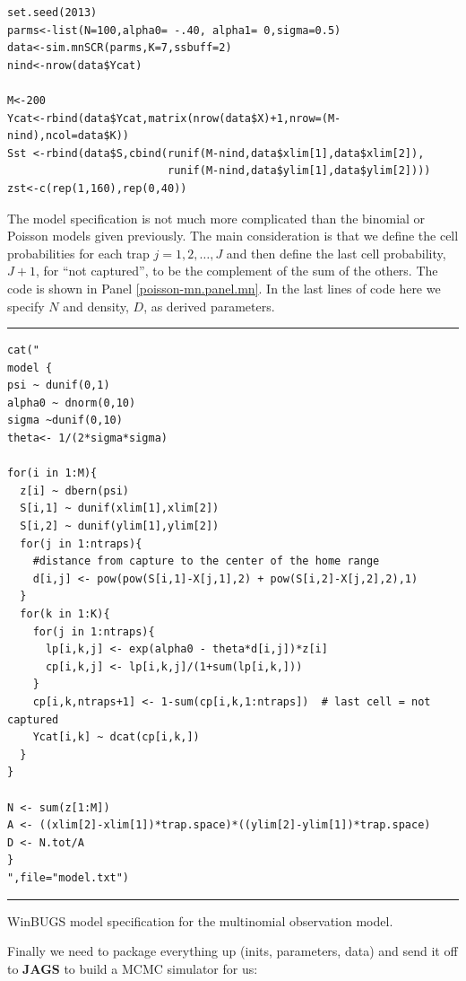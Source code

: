 {{\small 
\begin{verbatim}
set.seed(2013)
parms<-list(N=100,alpha0= -.40, alpha1= 0,sigma=0.5)
data<-sim.mnSCR(parms,K=7,ssbuff=2)
nind<-nrow(data$Ycat)

M<-200
Ycat<-rbind(data$Ycat,matrix(nrow(data$X)+1,nrow=(M-nind),ncol=data$K))
Sst <-rbind(data$S,cbind(runif(M-nind,data$xlim[1],data$xlim[2]),
                         runif(M-nind,data$ylim[1],data$ylim[2])))
zst<-c(rep(1,160),rep(0,40))
\end{verbatim}
}

The model specification is not much more complicated than the binomial
or Poisson models given previously. The main consideration is that we
define the cell probabilities for each trap $j=1,2,\dots,J$ and then
define the last cell probability, $J+1$, for ``not captured'', to be
the complement of the sum of the others. The code is shown in Panel
\ref{poisson-mn.panel.mn}.
In the last lines of code here we
specify $N$ and density, $D$, as  derived parameters.


\begin{panel}[htp]
\centering
\rule[0.15in]{\textwidth}{.03in}
{\small
\begin{verbatim}
cat("
model {
psi ~ dunif(0,1)
alpha0 ~ dnorm(0,10)
sigma ~dunif(0,10)
theta<- 1/(2*sigma*sigma)

for(i in 1:M){
  z[i] ~ dbern(psi)
  S[i,1] ~ dunif(xlim[1],xlim[2])
  S[i,2] ~ dunif(ylim[1],ylim[2])
  for(j in 1:ntraps){
    #distance from capture to the center of the home range
    d[i,j] <- pow(pow(S[i,1]-X[j,1],2) + pow(S[i,2]-X[j,2],2),1)
  }
  for(k in 1:K){
    for(j in 1:ntraps){
      lp[i,k,j] <- exp(alpha0 - theta*d[i,j])*z[i]            
      cp[i,k,j] <- lp[i,k,j]/(1+sum(lp[i,k,]))
    }
    cp[i,k,ntraps+1] <- 1-sum(cp[i,k,1:ntraps])  # last cell = not captured
    Ycat[i,k] ~ dcat(cp[i,k,])
  }  
}   

N <- sum(z[1:M]) 
A <- ((xlim[2]-xlim[1])*trap.space)*((ylim[2]-ylim[1])*trap.space)
D <- N.tot/A
}
",file="model.txt")

\end{verbatim}
}
\rule[-0.15in]{\textwidth}{.03in}
\caption{
WinBUGS model specification for the multinomial observation model. 
}
\label{poisson-mn.panel.mn}
\end{panel}

Finally we need to package everything up (inits, parameters, data) and send
it off to {\bf JAGS} to build a MCMC simulator for us:

}
